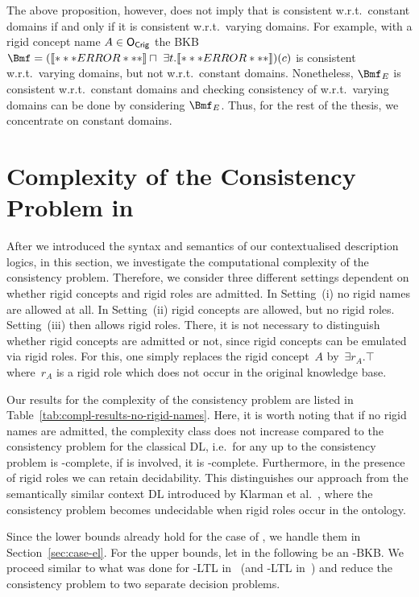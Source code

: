 \noindent
The above proposition, however, does not imply that \Bmf is consistent w.r.t.\ constant domains if
and only if it is consistent w.r.t.\ varying domains. For example, with a rigid concept name
$A\in\mathsf{O_{Crig}}$ the BKB
$\Bmf = (\oax{\top \sqsubseteq A} \sqcap\ \exists t.\oax{A \sqsubseteq \exists r.\lnot A})(c)$ is consistent w.r.t.\ varying domains, but not w.r.t.\ constant domains. Nonetheless,
$\Bmf_{E}$ is consistent w.r.t.\ constant domains and checking consistency of \Bmf w.r.t.\ varying
domains can be done by considering $\Bmf_{E}$.  Thus, for the rest of the thesis, we concentrate on
constant domains.

\section{Complexity of the Consistency Problem in \texorpdfstring{\LMLO}{LM⟦LO⟧}}
\label{sec:complexity-consis-problem}

After we introduced the syntax and semantics of our contextualised description logics, in this
section, we investigate the computational complexity of the consistency problem.  Therefore, we
consider three different settings dependent on whether rigid concepts and rigid roles are admitted.
In Setting~(i) no rigid names are allowed at all.  In Setting~(ii) rigid concepts are
allowed, but no rigid roles.  Setting~(iii) then allows rigid roles. There, it is not necessary
to distinguish whether rigid concepts are admitted or not, since rigid concepts can be emulated via
rigid roles. For this, one simply replaces the rigid concept~$A$ by~$\exists r_{A}.\top$ where~$r_{A}$ is
a rigid role which does not occur in the original knowledge base.

Our results for the complexity of the consistency problem are listed in
Table~\ref{tab:compl-results-no-rigid-names}. Here, it is worth noting that if no rigid names are
admitted, the complexity class does not increase compared to the consistency problem for the
classical DL, i.e.\ for any \LMLO up to \SHOQSHOQ the consistency problem is \ExpTime-complete, if
\SHOIQ is involved, it is \NExpTime-complete. Furthermore, in the presence of rigid roles we can
retain decidability.  This distinguishes our approach from the semantically similar context DL
introduced by Klarman et al.~\cite{KG-JELIA10,KG16}, where the consistency problem becomes
undecidable when rigid roles occur in the ontology.

Since the lower bounds already hold for the case of \EL, we handle them in Section~\ref{sec:case-el}.
%
For the upper bounds, let in the following \BB be an \LMLO-BKB.  We proceed
similar to what was done for \ALC-LTL in~\cite{BaGL-KR08,BaGL-ToCL12} (and
\SHOQ-LTL in~\cite{Lip-PhD14}) and reduce the consistency problem to two separate
decision problems.

